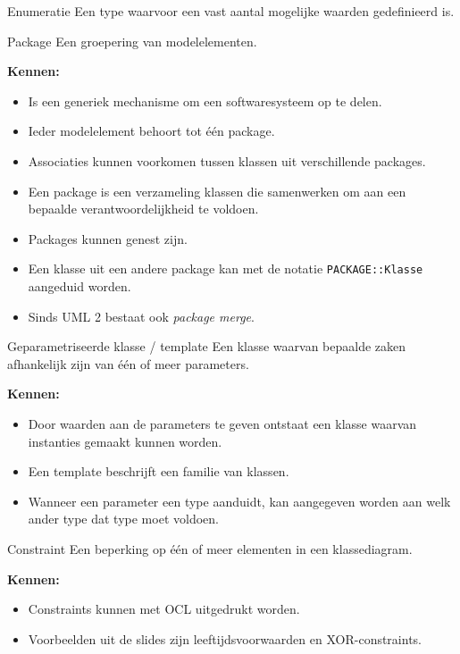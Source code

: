 \documentclass[11pt,a4paper]{article}
\begin{document}
\begin{definition}{Enumeratie}
Een type waarvoor een vast aantal mogelijke waarden gedefinieerd is.
\end{definition}

\begin{definition}{Package}
Een groepering van modelelementen.

\textbf{Kennen:}
\begin{itemize}
    \item Is een generiek mechanisme om een softwaresysteem op te delen.
    \item Ieder modelelement behoort tot één package.
    \item Associaties kunnen voorkomen tussen klassen uit verschillende packages.
    \item Een package is een verzameling klassen die samenwerken om aan een bepaalde verantwoordelijkheid te voldoen.
    \item Packages kunnen genest zijn.
    \item Een klasse uit een andere package kan met de notatie \texttt{PACKAGE::Klasse} aangeduid worden.
    \item Sinds UML 2 bestaat ook \textit{package merge}.
\end{itemize}
\end{definition}

\begin{definition}{Geparametriseerde klasse / template}
Een klasse waarvan bepaalde zaken afhankelijk zijn van één of meer parameters.

\textbf{Kennen:}
\begin{itemize}
    \item Door waarden aan de parameters te geven ontstaat een klasse waarvan instanties gemaakt kunnen worden.
    \item Een template beschrijft een familie van klassen.
    \item Wanneer een parameter een type aanduidt, kan aangegeven worden aan welk ander type dat type moet voldoen.
\end{itemize}
\end{definition}

\begin{definition}{Constraint}
Een beperking op één of meer elementen in een klassediagram.

\textbf{Kennen:}
\begin{itemize}
    \item Constraints kunnen met OCL uitgedrukt worden.
    \item Voorbeelden uit de slides zijn leeftijdsvoorwaarden en XOR-constraints.
\end{itemize}
\end{definition}
\end{document}
